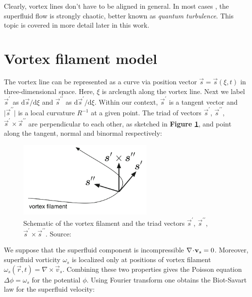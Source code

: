 Clearly, vortex lines don't have to be aligned in general. In most cases , the superfluid flow is strongly chaotic, better known as \textit{quantum turbulence}. This topic is covered in more detail later in this work.


\section{Vortex filament model}

The vortex line can be represented as a curve via position vector $\vec{s} = \vec{s}(\xi, t)$ in three-dimensional space. Here, $\xi$ is arclength along the vortex line. Next we label $\vec{s}^{\prime}$ as $\text{d}\vec{s} / \text{d} \xi$ and $\vec{s}^{\prime\prime}$ as $\text{d}\vec{s}^{\prime} / \text{d} \xi$.
Within our context, $\vec{s}^{\prime}$ is a tangent vector and $\vert \vec{s}^{\prime\prime} \vert$ is a local curvature $R^{-1}$ at a given point.
The triad of vectors $\vec{s}^{\prime}$, $\vec{s}^{\prime\prime}$, $\vec{s}^{\prime} \times \vec{s}^{\prime\prime}$ are perpendicular to each other, as sketched in \textbf{Figure \ref{filament}}, and point along the tangent, normal and binormal respectively:

\begin{figure}[h]
	\centering
	\includegraphics[width=0.6\textwidth]{graphics/theory/filament}
	\caption{Schematic of the vortex filament and the triad vectors $\vec{s}^{\prime}$, $\vec{s}^{\prime\prime}$, $\vec{s}^{\prime} \times \vec{s}^{\prime\prime}$. Source:\cite{tsubota}}
	\label{filament}
\end{figure}

We suppose that the superfluid component is incompressible $\nabla \!\cdot\! \mathbf{v}_s = 0$. Moreover, superfluid vorticity $\omega_s$ is localized only at positions of vortex filament $\omega_s(\vec{r},t) = \nabla \times \vec{v}_s$. Combining these two properties gives the Poisson equation $\Delta \phi = \omega_s$ for the potential $\phi$.
Using Fourier transform one obtains \cite{barenghi} the Biot-Savart law for the superfluid velocity:

